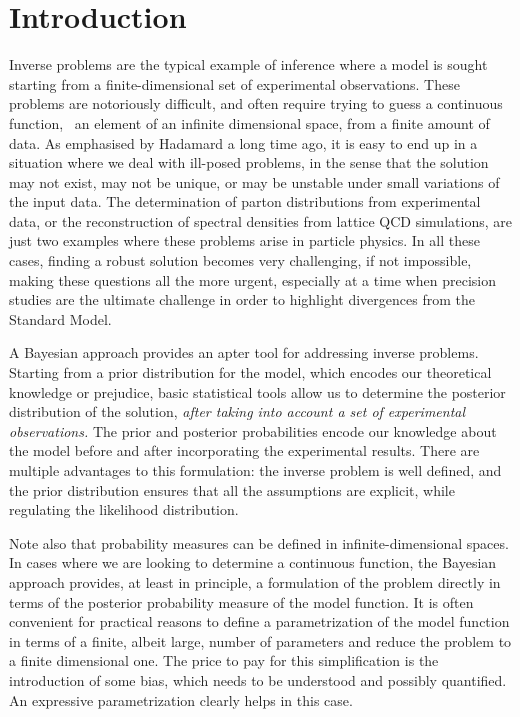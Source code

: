 \section{Introduction}
\label{sec:Intro}

Inverse problems are the typical example of inference where a model is sought
starting from a finite-dimensional set of experimental observations. These
problems are notoriously difficult, and often require trying to guess a
continuous function, \ie\ an element of an infinite dimensional space, from a
finite amount of data. As emphasised by Hadamard a long time ago, it is easy to
end up in a situation where we deal with ill-posed problems, in the sense that
the solution may not exist, may not be unique, or may be unstable under small
variations of the input data. The determination of parton distributions from
experimental data, or the reconstruction of spectral densities from lattice QCD
simulations, are just two examples where these problems arise in particle
physics. In all these cases, finding a robust solution becomes very challenging,
if not impossible, making these questions all the more urgent, especially at a
time when precision studies are the ultimate challenge in order to highlight
divergences from the Standard Model. 

A Bayesian approach provides an apter tool for addressing inverse problems.
Starting from a prior distribution for the model, which encodes our theoretical
knowledge or prejudice, basic statistical tools allow us to determine the
posterior distribution of the solution, {\it after taking into account a set of
experimental observations.} The prior and posterior probabilities encode our
knowledge about the model before and after incorporating the experimental
results. There are multiple advantages to this formulation: the inverse problem
is well defined, and the prior distribution ensures that all the assumptions are
explicit, while regulating the likelihood distribution. 

Note also that probability measures can be defined in infinite-dimensional
spaces. In cases where we are looking to determine a continuous function, the
Bayesian approach provides, at least in principle, a formulation of the problem
directly in terms of the posterior probability measure of the model function. It
is often convenient for practical reasons to define a parametrization of the
model function in terms of a finite, albeit large, number of parameters and
reduce the problem to a finite dimensional one. The price to pay for this
simplification is the introduction of some bias, which needs to be understood
and possibly quantified. An expressive parametrization clearly helps in this
case. 

